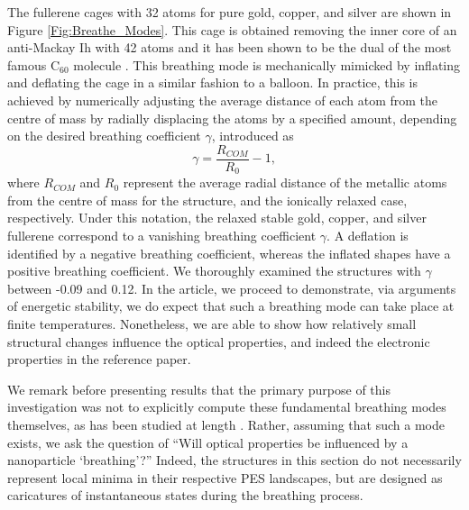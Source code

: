 The fullerene cages with 32 atoms for pure gold, copper, and silver are shown in Figure \ref{Fig:Breathe_Modes}. This cage is obtained removing the inner core of an anti-Mackay Ih with 42 atoms and it has been shown to be the dual of the most famous C$_{60}$ molecule \cite{Trombach2016}. This breathing mode is mechanically mimicked by inflating and deflating the cage in a similar fashion to a balloon. In practice, this is achieved by numerically adjusting the average distance of each atom from the centre of mass by radially displacing the atoms by a specified amount, depending on the desired breathing coefficient $\gamma$, introduced as
\begin{equation}
    \gamma=\frac{R_{COM}}{R_{0}}-1,
\end{equation}
where $R_{COM}$ and $R_0$ represent the average radial distance of the metallic atoms from the centre of mass for the structure, and the ionically relaxed case, respectively. Under this notation, the relaxed stable gold, copper, and silver fullerene correspond to a vanishing breathing coefficient $\gamma$. A deflation is identified by a negative breathing coefficient, whereas the inflated shapes have a positive breathing coefficient. We thoroughly examined the structures with $\gamma$ between -0.09 and 0.12. In the article, we proceed to demonstrate, via arguments of energetic stability, we do expect that such a breathing mode can take place at finite temperatures. Nonetheless, we are able to show how relatively small structural changes influence the optical properties, and indeed the electronic properties in the reference paper.

We remark before presenting results that the primary purpose of this investigation was not to explicitly compute these fundamental breathing modes themselves, as has been studied at length \cite{doi:10.1021/jp014068s,PhysRevB.80.035411,doi:10.1021/jp051575r}. Rather, assuming that such a mode exists, we ask the question of ``Will optical properties be influenced by a nanoparticle `breathing'?'' Indeed, the structures in this section do not necessarily represent local minima in their respective PES landscapes, but are designed as caricatures of instantaneous states during the breathing process. 

